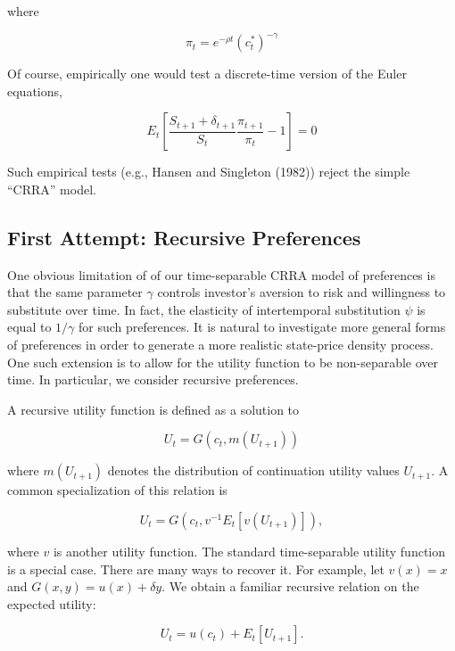 \documentclass[\topdir/lecture\_notes.tex]{subfiles}
\begin{document}
where

\begin{equation}
\pi_{t}=e^{-\rho t}\left(c_{t}^{*}\right)^{-\gamma}
\end{equation}

Of course, empirically one would test a discrete-time version of the Euler equations,

\begin{equation}
E_{t}\left[\frac{S_{t+1}+\delta_{t+1}}{S_{t}} \frac{\pi_{t+1}}{\pi_{t}}-1\right]=0
\end{equation}

Such empirical tests (e.g., Hansen and Singleton (1982)) reject the simple ``CRRA'' model.

\subsection{First Attempt: Recursive Preferences}
One obvious limitation of of our time-separable CRRA model of preferences is that the same parameter $\gamma$ controls investor's aversion to risk and willingness to substitute over time. In fact, the elasticity of intertemporal substitution $\psi$ is equal to $1 / \gamma$ for such preferences. It is natural to investigate more general forms of preferences in order to generate a more realistic state-price density process. One such extension is to allow for the utility function to be non-separable over time. In particular, we consider recursive preferences.

A recursive utility function is defined as a solution to

\begin{equation}
U_{t}=G\left(c_{t}, m\left(U_{t+1}\right)\right)
\end{equation}

where $m\left(U_{t+1}\right)$ denotes the distribution of continuation utility values $U_{t+1}$. A common specialization of this relation is

\begin{equation}
U_{t}=G\left(c_{t}, v^{-1} E_{t}\left[v\left(U_{t+1}\right)\right]\right),
\end{equation}

where $v$ is another utility function. The standard time-separable utility function is a special case. There are many ways to recover it. For example, let $v(x)=x$ and $G(x, y)=u(x)+\delta y$. We obtain a familiar recursive relation on the expected utility:

\begin{equation}
U_{t}=u\left(c_{t}\right)+E_{t}\left[U_{t+1}\right] .
\end{equation}
\end{document}
